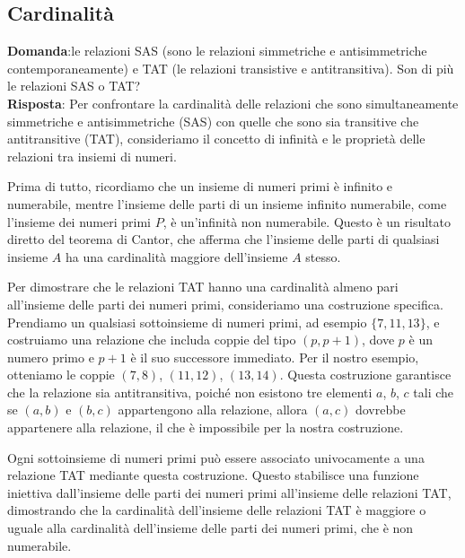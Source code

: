 \documentclass{article}
\begin{document}
\subsection{Cardinalità}
\textbf{Domanda}:le relazioni SAS (sono le relazioni simmetriche e antisimmetriche contemporaneamente) e TAT (le relazioni transistive e antitransitiva). Son di più le relazioni SAS o TAT? \\
\textbf{Risposta}: Per confrontare la cardinalità delle relazioni che sono simultaneamente simmetriche e antisimmetriche (SAS) con quelle che sono sia transitive che antitransitive (TAT), consideriamo il concetto di infinità e le proprietà delle relazioni tra insiemi di numeri.

Prima di tutto, ricordiamo che un insieme di numeri primi è infinito e numerabile, mentre l'insieme delle parti di un insieme infinito numerabile, come l'insieme dei numeri primi \(P\), è un'infinità non numerabile. Questo è un risultato diretto del teorema di Cantor, che afferma che l'insieme delle parti di qualsiasi insieme \(A\) ha una cardinalità maggiore dell'insieme \(A\) stesso.

Per dimostrare che le relazioni TAT hanno una cardinalità almeno pari all'insieme delle parti dei numeri primi, consideriamo una costruzione specifica. Prendiamo un qualsiasi sottoinsieme di numeri primi, ad esempio \(\{7, 11, 13\}\), e costruiamo una relazione che includa coppie del tipo \((p, p+1)\), dove \(p\) è un numero primo e \(p+1\) è il suo successore immediato. Per il nostro esempio, otteniamo le coppie \((7, 8)\), \((11, 12)\), \((13, 14)\). Questa costruzione garantisce che la relazione sia antitransitiva, poiché non esistono tre elementi \(a\), \(b\), \(c\) tali che se \((a, b)\) e \((b, c)\) appartengono alla relazione, allora \((a, c)\) dovrebbe appartenere alla relazione, il che è impossibile per la nostra costruzione.

Ogni sottoinsieme di numeri primi può essere associato univocamente a una relazione TAT mediante questa costruzione. Questo stabilisce una funzione iniettiva dall'insieme delle parti dei numeri primi all'insieme delle relazioni TAT, dimostrando che la cardinalità dell'insieme delle relazioni TAT è maggiore o uguale alla cardinalità dell'insieme delle parti dei numeri primi, che è non numerabile.
\end{document}
